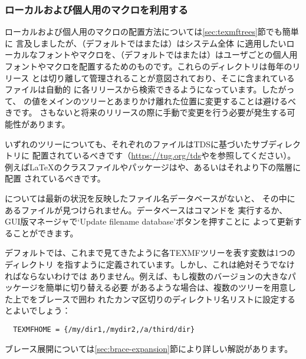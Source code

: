 \documentclass[uplatex,dvipdfmx,12pt]{jsarticle}
\begin{document}
\subsubsection{ローカルおよび個人用のマクロを利用する}
\label{sec:local-personal-macros}

ローカルおよび個人用のマクロの配置方法については\ref{sec:texmftrees}節でも簡単に
言及しましたが、（デフォルトではまたは）はシステム全体
に適用したいローカルなフォントやマクロを、（デフォルトではまたは）はユーザごとの個人用
フォントやマクロを配置するためのものです。これらのディレクトリは毎年のリリース
とは切り離して管理されることが意図されており、そこに含まれているファイルは自動的
に各\TL リリースから検索できるようになっています。したがって、%
の値をメインの\TL ツリーとあまりかけ離れた位置に変更することは避けるべきです。
さもないと将来のリリースの際に手動で変更を行う必要が発生する可能性があります。

いずれのツリーについても、それぞれのファイルはTDSに基づいたサブディレクトリに
配置されているべきです（\url{https://tug.org/tds}やを参照してください）。例えば\LaTeX のクラスファイルやパッケージはや、あるいはそれより下の階層に配置
されているべきです。

については最新の状況を反映したファイル名データベースがないと、
その中にあるファイルが見つけられません。データベースはコマンドを
実行するか、GUI版\TL マネージャで`Update filename database'ボタンを押すことに
よって更新することができます。

デフォルトでは、これまで見てきたように各TEXMFツリーを表す変数は1つのディレクトリ
を指すように定義されています。しかし、これは絶対そうでなければならないわけでは
ありません。例えば、もし複数のバージョンの大きなパッケージを簡単に切り替える必要
があるような場合は、複数のツリーを用意した上でをブレースで囲わ
れたカンマ区切りのディレクトリ名リストに設定するとよいでしょう：
%
\begin{verbatim}
  TEXMFHOME = {/my/dir1,/mydir2,/a/third/dir}
\end{verbatim}
%
ブレース展開については\ref{sec:brace-expansion}節により詳しい解説があります。
\end{document}
